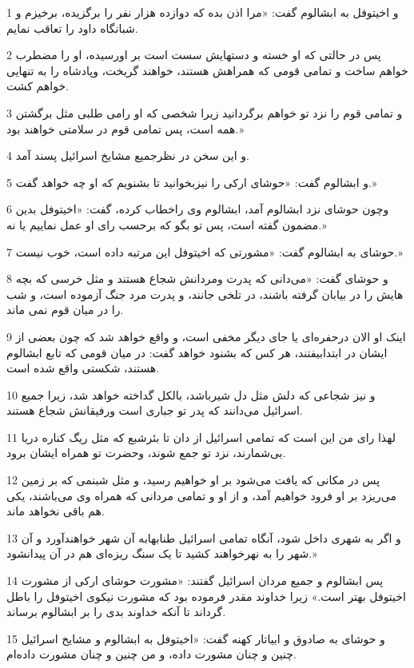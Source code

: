 \par 1 و اخیتوفل به ابشالوم گفت: «مرا اذن بده که دوازده هزار نفر را برگزیده، برخیزم و شبانگاه داود را تعاقب نمایم.
\par 2 پس در حالتی که او خسته و دستهایش سست است بر اورسیده، او را مضطرب خواهم ساخت و تمامی قومی که همراهش هستند، خواهند گریخت، وپادشاه را به تنهایی خواهم کشت.
\par 3 و تمامی قوم را نزد تو خواهم برگردانید زیرا شخصی که او رامی طلبی مثل برگشتن همه است، پس تمامی قوم در سلامتی خواهند بود.»
\par 4 و این سخن در نظرجمیع مشایخ اسرائیل پسند آمد.
\par 5 و ابشالوم گفت: «حوشای ارکی را نیزبخوانید تا بشنویم که او چه خواهد گفت.»
\par 6 وچون حوشای نزد ابشالوم آمد، ابشالوم وی راخطاب کرده، گفت: «اخیتوفل بدین مضمون گفته است، پس تو بگو که بر‌حسب رای او عمل نماییم یا نه.»
\par 7 حوشای به ابشالوم گفت: «مشورتی که اخیتوفل این مرتبه داده است، خوب نیست.»
\par 8 و حوشای گفت: «می‌دانی که پدرت ومردانش شجاع هستند و مثل خرسی که بچه هایش را در بیابان گرفته باشند، در تلخی جانند، و پدرت مرد جنگ آزموده است، و شب را در میان قوم نمی ماند.
\par 9 اینک او الان درحفره‌ای یا جای دیگر مخفی است، و واقع خواهد شد که چون بعضی از ایشان در ابتدابیفتند، هر کس که بشنود خواهد گفت: در میان قومی که تابع ابشالوم هستند، شکستی واقع شده است.
\par 10 و نیز شجاعی که دلش مثل دل شیرباشد، بالکل گداخته خواهد شد، زیرا جمیع اسرائیل می‌دانند که پدر تو جباری است ورفیقانش شجاع هستند.
\par 11 لهذا رای من این است که تمامی اسرائیل از دان تا بئرشبع که مثل ریگ کناره دریا بی‌شمارند، نزد تو جمع شوند، وحضرت تو همراه ایشان برود.
\par 12 پس در مکانی که یافت می‌شود بر او خواهیم رسید، و مثل شبنمی که بر زمین می‌ریزد بر او فرود خواهیم آمد، و از او و تمامی مردانی که همراه وی می‌باشند، یکی هم باقی نخواهد ماند.
\par 13 و اگر به شهری داخل شود، آنگاه تمامی اسرائیل طنابهابه آن شهر خواهند‌آورد و آن شهر را به نهرخواهند کشید تا یک سنگ ریزه‌ای هم در آن پیدانشود.»
\par 14 پس ابشالوم و جمیع مردان اسرائیل گفتند: «مشورت حوشای ارکی از مشورت اخیتوفل بهتر است.» زیرا خداوند مقدر فرموده بود که مشورت نیکوی اخیتوفل را باطل گرداند تا آنکه خداوند بدی را بر ابشالوم برساند.
\par 15 و حوشای به صادوق و ابیاتار کهنه گفت: «اخیتوفل به ابشالوم و مشایخ اسرائیل چنین و چنان مشورت داده، و من چنین و چنان مشورت داده‌ام.
